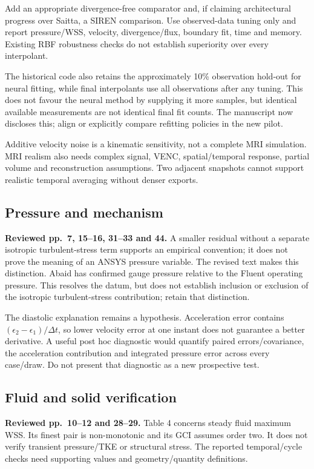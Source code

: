 \documentclass[11pt,a4paper]{article}
\begin{document}
Add an appropriate divergence-free comparator and, if claiming architectural progress over Saitta, a SIREN comparison. Use observed-data tuning only and report pressure/WSS, velocity, divergence/flux, boundary fit, time and memory. Existing RBF robustness checks do not establish superiority over every interpolant.

The historical code also retains the approximately 10\% observation hold-out for neural fitting, while final interpolants use all observations after any tuning. This does not favour the neural method by supplying it more samples, but identical available measurements are not identical final fit counts. The manuscript now discloses this; align or explicitly compare refitting policies in the new pilot.

Additive velocity noise is a kinematic sensitivity, not a complete MRI simulation. MRI realism also needs complex signal, VENC, spatial/temporal response, partial volume and reconstruction assumptions. Two adjacent snapshots cannot support realistic temporal averaging without denser exports.

\subsection{Pressure and mechanism}

\textbf{Reviewed pp.~7, 15--16, 31--33 and 44.} A smaller residual without a separate isotropic turbulent-stress term supports an empirical convention; it does not prove the meaning of an ANSYS pressure variable. The revised text makes this distinction. Abaid has confirmed gauge pressure relative to the Fluent operating pressure. This resolves the datum, but does not establish inclusion or exclusion of the isotropic turbulent-stress contribution; retain that distinction.

The diastolic explanation remains a hypothesis. Acceleration error contains $(\epsilon_2-\epsilon_1)/\Delta t$, so lower velocity error at one instant does not guarantee a better derivative. A useful post hoc diagnostic would quantify paired errors/covariance, the acceleration contribution and integrated pressure error across every case/draw. Do not present that diagnostic as a new prospective test.

\subsection{Fluid and solid verification}

\textbf{Reviewed pp.~10--12 and 28--29.} Table 4 concerns steady fluid maximum WSS. Its finest pair is non-monotonic and its GCI assumes order two. It does not verify transient pressure/TKE or structural stress. The reported temporal/cycle checks need supporting values and geometry/quantity definitions.
\end{document}
